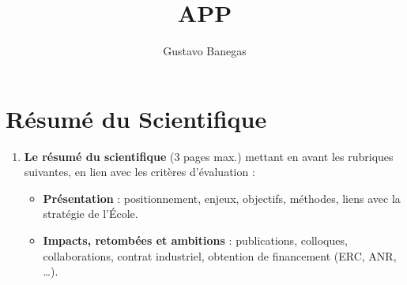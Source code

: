 \documentclass[11pt, a4paper]{article}
\begin{document}
\title{APP}
\author{Gustavo Banegas}
\date{}
\maketitle

\section{Résumé du Scientifique}
\begin{enumerate}
    \item \textbf{Le résumé du scientifique} (3 pages max.) mettant en avant les rubriques suivantes, en lien avec les critères d’évaluation :
    \begin{itemize}
        \item \textbf{Présentation} : positionnement, enjeux, objectifs, méthodes, liens avec la stratégie de l’École.
        \item \textbf{Impacts, retombées et ambitions} : publications, colloques, collaborations, contrat industriel, obtention de financement (ERC, ANR, …).
    \end{itemize}
\end{enumerate}
\end{document}

